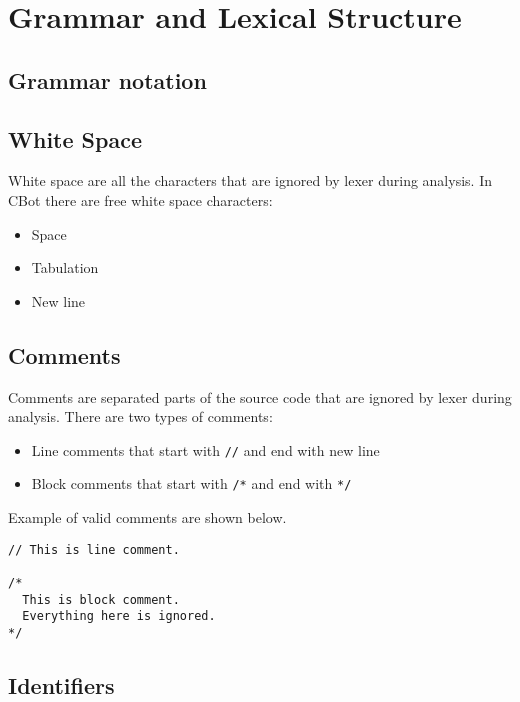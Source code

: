 
\chapter{Grammar and Lexical Structure}
\label{chap:cbot_grammar}

\section{Grammar notation}



\section{White Space}
White space are all the characters that are ignored by lexer during analysis. In CBot there are free white space characters:

\begin{itemize}
    \item Space
    \item Tabulation
    \item New line
\end{itemize}


\section{Comments}
Comments are separated parts of the source code that are ignored by lexer during analysis. There are two types of comments:

\begin{itemize}
    \item Line comments that start with \texttt{//} and end with new line
    \item Block comments that start with \texttt{/*} and end with \texttt{*/}
\end{itemize}

Example of valid comments are shown below.

\begin{lstlisting}[style=cbot]
// This is line comment.

/*
  This is block comment.
  Everything here is ignored.
*/
\end{lstlisting}


\section{Identifiers}
\label{sec:identifiers}



